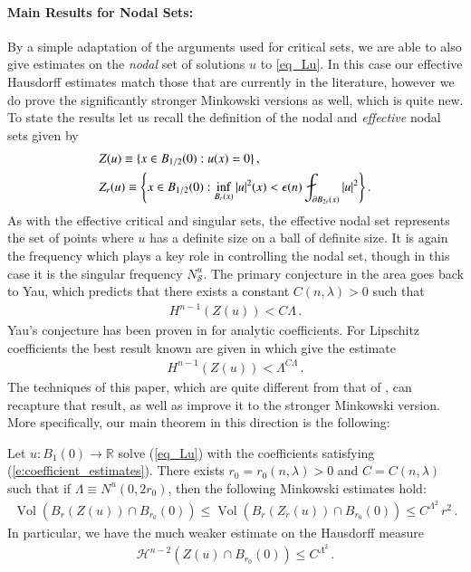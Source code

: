\documentclass[11pt]{article}
\begin{document}
\paragraph{Main Results for Nodal Sets:}  By a simple adaptation of the arguments used for critical sets, we are able to also give estimates on the {\it nodal} set of solutions $u$ to \eqref{eq_Lu}.  In this case our effective Hausdorff estimates match those that are currently in the literature, however we do prove the significantly stronger Minkowski versions as well, which is quite new.  To state the results let us recall the definition of the nodal and {\it effective} nodal sets given by
\begin{align}
&Z(u)\equiv \{x\in B_{1/2}(0):u(x)=0\}\, ,\notag\\
&Z_r(u)\equiv {\left\{{x\in B_{1/2}(0): \inf_{B_r(x)}|u|^2(x)<\epsilon(n)\fint_{\partial B_{2r}(x)}|u|^2}\right\}}\, .
\end{align}
As with the effective critical and singular sets, the effective nodal set represents the set of points where $u$ has a definite size on a ball of definite size.  It is again the frequency which plays a key role in controlling the nodal set, though in this case it is the singular frequency $N^u_{\mathcal{S}}$.  The primary conjecture in the area goes back to Yau, which predicts that there exists a constant $C(n,\lambda)>0$ such that
\begin{align}
H^{n-1}(Z(u))< C\Lambda\, .
\end{align}
Yau's conjecture has been proven in \cite{DonFef} for analytic coefficients.  For Lipschitz coefficients the best result known are given in \cite{HardtSimon} which give the estimate
\begin{align}
H^{n-1}(Z(u))< \Lambda^{C\Lambda}\, .
\end{align}
The techniques of this paper, which are quite different from that of \cite{HardtSimon}, can recapture that result, as well as improve it to the stronger Minkowski version.  More specifically, our main theorem in this direction is the following:

\begin{theorem}\label{t:main_nodal}
Let $u:B_1(0)\to {\mathds{R}}$ solve (\ref{eq_Lu}) with the coefficients satisfying (\ref{e:coefficient_estimates}).  There exists $r_0=r_0(n,\lambda)>0$ and $C=C(n,\lambda)$ such that if $\Lambda\equiv N^u(0,2r_0)$, then the following Minkowski estimates hold:
\begin{align}\label{e:mink_est_nod}
{\operatorname{Vol}}(B_r(Z(u))\cap B_{r_0}(0)) \leq {\operatorname{Vol}}(B_r(Z_r(u))\cap B_{r_0}(0)) \leq C^{\Lambda^2}\, r^2\, .
\end{align}
In particular, we have the much weaker estimate on the Hausdorff measure
\begin{align}\label{e:haus_est_nod}
{\mathcal{H}}^{n-2}(Z(u)\cap B_{r_0}(0))\leq C^{\Lambda^2}\, .
\end{align}
\end{theorem}
\end{document}
